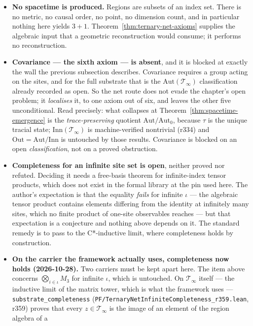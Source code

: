 \begin{itemize}
\item \textbf{No spacetime is produced.} Regions are subsets of an index set.
There is no metric, no causal order, no point, no dimension count, and in
particular nothing here yields $3+1$. Theorem~\ref{thm:ternary-net-axioms}
supplies the algebraic input that a geometric reconstruction would consume; it
performs no reconstruction.
\item \textbf{Covariance --- the sixth axiom --- is absent}, and it is blocked at
exactly the wall the previous subsection describes. Covariance requires a group
acting on the sites, and for the full substrate that is the
$\text{Aut}(\mathcal{T}_\infty)$ classification already recorded as open. So the
net route does not evade the chapter's open problem; it \emph{localises} it, to
one axiom out of six, and leaves the other five unconditional. Read precisely:
what collapses at Theorem~\ref{thm:spacetime-emergence} is the
\emph{trace-preserving} quotient $\mathrm{Aut}/\mathrm{Aut}_0$, because $\tau$
is the unique tracial state; $\mathrm{Inn}(\mathcal{T}_\infty)$ is
machine-verified nontrivial (r334) and $\mathrm{Out} =
\mathrm{Aut}/\mathrm{Inn}$ is untouched by those results. Covariance is blocked
on an open \emph{classification}, not on a proved obstruction.
\item \textbf{Completeness for an infinite site set is open}, neither proved nor
refuted. Deciding it needs a free-basis theorem for infinite-index tensor
products, which does not exist in the formal library at the pin used here. The
author's expectation is that the equality \emph{fails} for infinite $\iota$ ---
the algebraic tensor product contains elements differing from the identity at
infinitely many sites, which no finite product of one-site observables reaches
--- but that expectation is a conjecture and nothing above depends on it. The
standard remedy is to pass to the C*-inductive limit, where completeness holds
by construction.
\item \textbf{On the carrier the framework actually uses, completeness now
holds (2026-10-28).} Two carriers must be kept apart here. The item above
concerns $\bigotimes_{i \in \iota} M_3$ for infinite $\iota$, which is
untouched. On $\mathcal{T}_\infty$ itself --- the inductive limit of the
matrix tower, which is what the framework uses --- \texttt{substrate\_completeness}
(\texttt{PF/TernaryNetInfiniteCompleteness\_r359.lean}, r359) proves that every
$z \in \mathcal{T}_\infty$ is the image of an element of the region algebra of a

\end{itemize}
